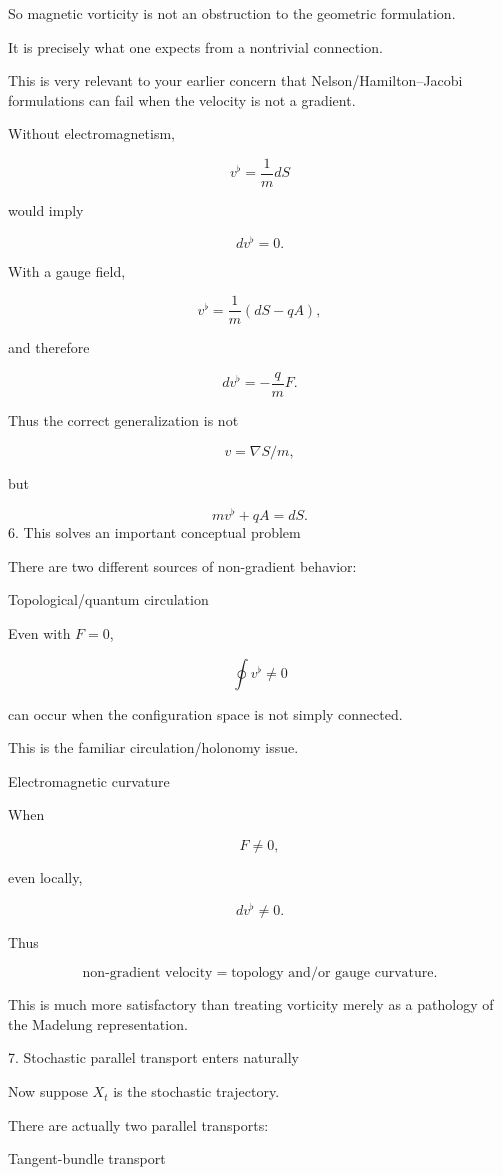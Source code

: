 So magnetic vorticity is not an obstruction to the geometric formulation.

It is precisely what one expects from a nontrivial connection.

This is very relevant to your earlier concern that Nelson/Hamilton--Jacobi formulations can fail when the velocity is not a gradient.

Without electromagnetism,

$$ v^\flat=\frac1m dS $$

would imply

$$ dv^\flat=0. $$

With a gauge field,

$$ v^\flat=\frac1m(dS-qA), $$

and therefore

$$ dv^\flat=-\frac qmF. $$

Thus the correct generalization is not

$$ v=\nabla S/m, $$

but

$$ \boxed{ mv^\flat+qA=dS. } $$
6. This solves an important conceptual problem

There are two different sources of non-gradient behavior:

Topological/quantum circulation

Even with \(F=0\),

$$ \oint v^\flat\neq0 $$

can occur when the configuration space is not simply connected.

This is the familiar circulation/holonomy issue.

Electromagnetic curvature

When

$$ F\neq0, $$

even locally,

$$ dv^\flat\neq0. $$

Thus

$$ \boxed{ \text{non-gradient velocity} = \text{topology and/or gauge curvature}. } $$

This is much more satisfactory than treating vorticity merely as a pathology of the Madelung representation.

7. Stochastic parallel transport enters naturally

Now suppose \(X_t\) is the stochastic trajectory.

There are actually two parallel transports:

Tangent-bundle transport

